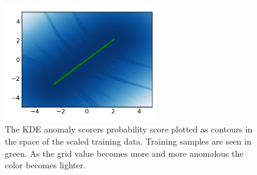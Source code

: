     
     \begin{figure}
        \centering
        \includegraphics[width=0.6\textwidth]{report/figures/analysis/plant2_train_short/kde_boundary.png}
        \caption{The KDE anomaly scorers probability score plotted as contours in the space of the scaled training data. Training samples are seen in green. As the grid value becomes more and more anomalous the color becomes lighter.}
        \label{fig:my_label}
    \end{figure}
    
    
    
    
    
